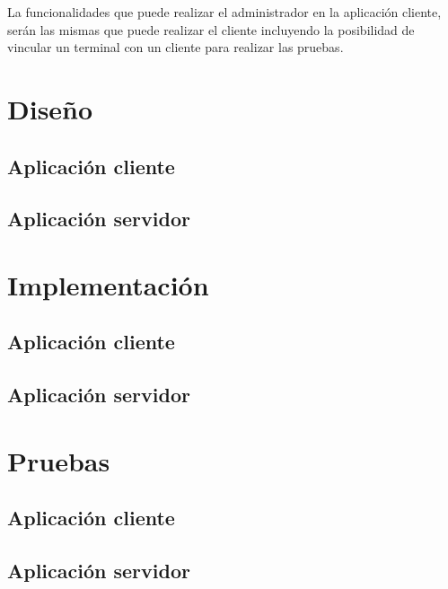 \documentclass[spanish,a4paper,10pt]{article}
\begin{document}
La funcionalidades que puede realizar el administrador en la aplicación cliente, serán las mismas que puede realizar el cliente incluyendo la posibilidad de vincular un terminal con un cliente para realizar 
las pruebas. 




\section{Diseño}
\subsection{Aplicación cliente}
\subsection{Aplicación servidor}

\section{Implementación}
\subsection{Aplicación cliente}
\subsection{Aplicación servidor}

\section{Pruebas}
\subsection{Aplicación cliente}
\subsection{Aplicación servidor}
\end{document}
